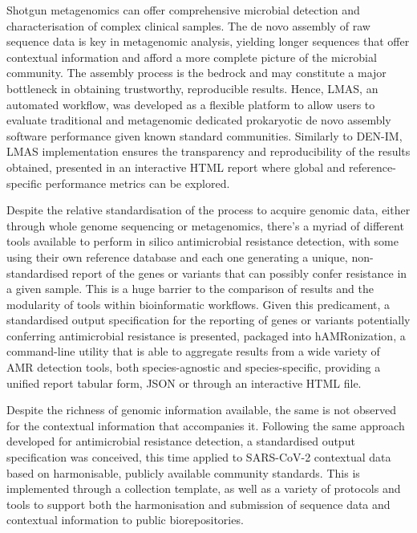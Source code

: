 Shotgun metagenomics can offer comprehensive microbial detection and characterisation of
complex clinical samples. The de novo assembly of raw sequence data is key in metagenomic analysis, yielding longer sequences that offer contextual information and afford a more complete picture of the microbial community. The assembly process is the bedrock and may constitute a major bottleneck in obtaining trustworthy, reproducible results. Hence, LMAS, an automated workflow, was developed as a flexible platform to allow users to evaluate traditional and metagenomic dedicated prokaryotic de novo assembly software performance given known standard communities. Similarly to DEN-IM, LMAS implementation ensures the transparency and reproducibility of the results obtained, presented in an interactive HTML report where global and reference-specific performance metrics can be explored. 

Despite the relative standardisation of the process to acquire genomic data, either through whole genome sequencing or metagenomics, there’s a myriad of different tools available to perform in silico antimicrobial resistance detection, with some using their own reference database and each one generating a unique, non-standardised report of the genes or variants that can possibly confer resistance in a given sample. This is a huge barrier to the comparison of results and the modularity of tools within bioinformatic workflows. Given this predicament, a standardised output specification for the reporting of genes or variants potentially conferring antimicrobial resistance is presented, packaged into hAMRonization, a command-line utility that is able to aggregate results from a wide variety of AMR detection tools, both species-agnostic and species-specific, providing a unified report tabular form, JSON or through an interactive HTML file. 

Despite the richness of genomic information available, the same is not observed for the contextual information that accompanies it. Following the same approach developed for antimicrobial resistance detection, a standardised output specification was conceived, this time applied to SARS-CoV-2 contextual data based on harmonisable, publicly available community standards. This is implemented through a collection template, as well as a variety of protocols and tools to support both the harmonisation and submission of sequence data and contextual information to public biorepositories. 

